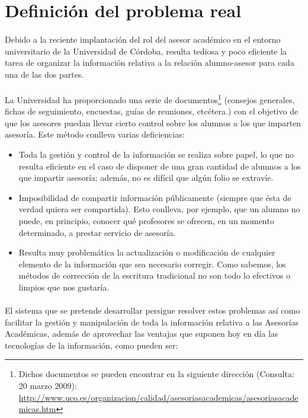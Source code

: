 \section{Definición del problema real}

\paragraph{}Debido a la reciente implantación del rol del asesor académico en el
entorno
universitario de la Universidad de Córdoba, resulta tediosa y poco eficiente la
tarea de organizar la información relativa a la relación alumno-asesor para
cada una de las dos partes.

\paragraph{}La Universidad ha proporcionado una serie de
documentos\footnote{Dichos documentos se pueden encontrar en la
siguiente dirección (Consulta: 20 marzo 2009): \url{http://www.uco.es/organizacion/calidad/asesoriasacademicas/asesoriasacademicas.htm}
} (consejos generales, fichas de seguimiento, encuestas, guías de
reuniones, etcétera.) con
el objetivo de que los asesores puedan llevar cierto control sobre los alumnos
a los que imparten asesoría. Este método conlleva varias deficiencias:

\begin{itemize}
 \item Toda la gestión y control de la información se realiza sobre papel, lo
       que no resulta eficiente en el caso de disponer de una gran cantidad de
       alumnos a los que impartir asesoría; además, no es difícil que algún
       folio se extravíe.
 \item Imposibilidad de compartir información públicamente (siempre que ésta
       de verdad quiera ser compartida). Esto conlleva, por ejemplo, que un
       alumno no puede, en principio, conocer qué profesores se ofrecen, en un
       momento determinado, a prestar servicio de asesoría.
 \item Resulta muy problemática la actualización o modificación de cualquier
       elemento de la información que sea necesario corregir. Como sabemos, los
       métodos de corrección de la escritura tradicional no son todo lo
       efectivos o limpios que nos gustaría.
\end{itemize}

\paragraph{}El sistema que se pretende desarrollar persigue resolver estos
problemas así
como facilitar la gestión y manipulación de toda la información relativa a
las Asesorías Académicas, además de aprovechar las ventajas que suponen hoy en
día las tecnologías de la información, como pueden ser:

